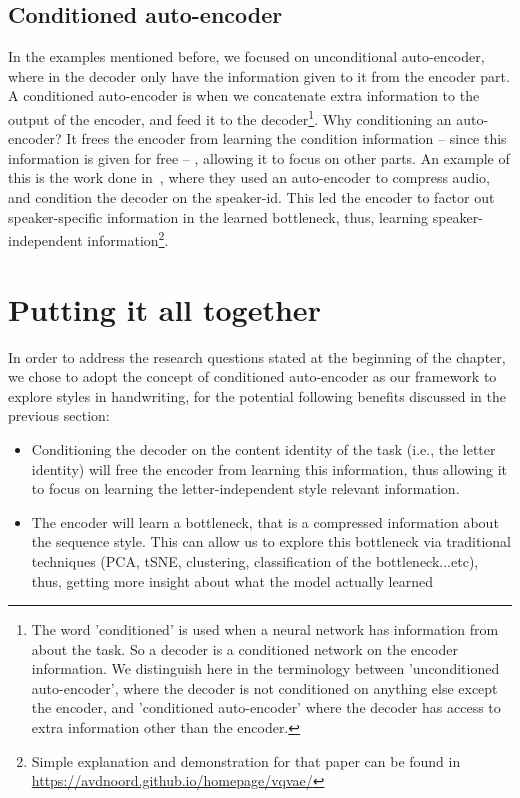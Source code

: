   \subsection{Conditioned auto-encoder}
    \par In the examples mentioned before, we focused on unconditional auto-encoder, where in the decoder only have the information given to it from the encoder part. A conditioned auto-encoder is when we concatenate extra information to the output of the encoder, and feed it to the decoder\footnote{The word 'conditioned' is used when a neural network has information from about the task. So a decoder is a conditioned network on the encoder information. We distinguish here in the terminology between 'unconditioned auto-encoder', where the decoder is not conditioned on anything else except the encoder, and 'conditioned auto-encoder' where the decoder has access to extra information other than the encoder.}. Why conditioning an auto-encoder? It frees the encoder from learning the condition information -- since this information is given for free -- , allowing it to focus on other parts. An example of this is the work done in~\citep{van2017neural}, where they used an auto-encoder to compress audio, and condition the decoder on the speaker-id. This led the encoder to factor out speaker-specific information in the learned bottleneck, thus, learning speaker-independent information\footnote{Simple explanation and demonstration for that paper can be found in \url{https://avdnoord.github.io/homepage/vqvae/}}.

\section{Putting it all together}
  \par In order to address the research questions stated at the beginning of the chapter, we chose to adopt the concept of conditioned auto-encoder as our framework to explore styles in handwriting, for the potential following benefits discussed in the previous section:
  \begin{itemize}
    \item Conditioning the decoder on the content identity of the task (i.e., the letter identity) will free the encoder from learning this information, thus allowing it to focus on learning the letter-independent style relevant information.
    \item The encoder will learn a bottleneck, that is a compressed information about the sequence style. This can allow us to explore this bottleneck via traditional techniques (PCA, tSNE, clustering, classification of the bottleneck...etc), thus, getting more insight about what the model actually learned
  \end{itemize}

